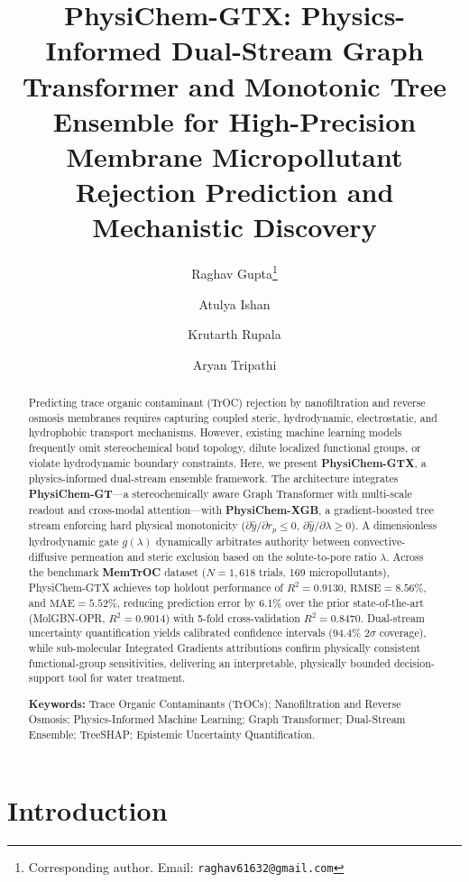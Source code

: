 \documentclass[11pt]{article}
\title{\vspace{-1.0cm}\Large\textbf{PhysiChem-GTX: Physics-Informed Dual-Stream Graph Transformer and Monotonic Tree Ensemble for High-Precision Membrane Micropollutant Rejection Prediction and Mechanistic Discovery}}
\author{Raghav Gupta\thanks{Corresponding author. Email: \texttt{raghav61632@gmail.com}}}
\author{Atulya Ishan}
\author{Krutarth Rupala}
\author{Aryan Tripathi}
\affil{Department of Data Science and Engineering, Manipal Institute of Technology, Manipal Academy of Higher Education, Manipal, Karnataka 576104, India}
\date{}
\newcommand{\rsq}{R^{2}}
\begin{document}
\maketitle

\begin{abstract}
\noindent
Predicting trace organic contaminant (TrOC) rejection by nanofiltration and reverse osmosis membranes requires capturing coupled steric, hydrodynamic, electrostatic, and hydrophobic transport mechanisms. However, existing machine learning models frequently omit stereochemical bond topology, dilute localized functional groups, or violate hydrodynamic boundary constraints. Here, we present \textbf{PhysiChem-GTX}, a physics-informed dual-stream ensemble framework. The architecture integrates \textbf{PhysiChem-GT}---a stereochemically aware Graph Transformer with multi-scale readout and cross-modal attention---with \textbf{PhysiChem-XGB}, a gradient-boosted tree stream enforcing hard physical monotonicity ($\partial \hat{y}/\partial r_p \leq 0$, $\partial \hat{y}/\partial \lambda \geq 0$). A dimensionless hydrodynamic gate $g(\lambda)$ dynamically arbitrates authority between convective-diffusive permeation and steric exclusion based on the solute-to-pore ratio $\lambda$. Across the benchmark \textbf{MemTrOC} dataset ($N = 1{,}618$ trials, 169 micropollutants), PhysiChem-GTX achieves top holdout performance of $\rsq = 0.9130$, $\mathrm{RMSE} = 8.56\%$, and $\mathrm{MAE} = 5.52\%$, reducing prediction error by 6.1\% over the prior state-of-the-art (MolGBN-OPR, $\rsq = 0.9014$) with 5-fold cross-validation $\rsq = 0.8470$. Dual-stream uncertainty quantification yields calibrated confidence intervals ($94.4\%$ $2\sigma$ coverage), while sub-molecular Integrated Gradients attributions confirm physically consistent functional-group sensitivities, delivering an interpretable, physically bounded decision-support tool for water treatment.

\smallskip
\noindent\textbf{Keywords:} Trace Organic Contaminants (TrOCs); Nanofiltration and Reverse Osmosis; Physics-Informed Machine Learning; Graph Transformer; Dual-Stream Ensemble; TreeSHAP; Epistemic Uncertainty Quantification.
\end{abstract}

\vspace{0.4cm}


\section{Introduction}
\label{sec:intro}
\end{document}
